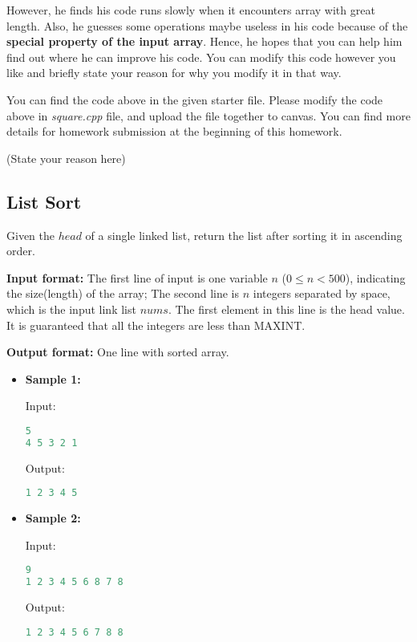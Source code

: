 \documentclass[11pt]{exam}
\begin{document}
However, he finds his code runs slowly when it encounters array with great length. Also, he guesses some operations maybe useless in his code because of the \textbf{special property of the input array}. Hence, he hopes that you can help him find out where he can improve his code. You can modify this code however you like and briefly state your reason for why you modify it in that way.

You can find the code above in the given starter file. Please modify the code above in \textit{square.cpp} file, and upload the file together to canvas. You can find more details for homework submission at the beginning of this homework.
\begin{solution}
(State your reason here)
\end{solution}

\subsection{List Sort}

Given the $head$ of a single linked list, return the list after sorting it in ascending order.

\textbf{Input format:} The first line of input is one variable $n$ ($0 \leq n < 500$), indicating the size(length) of the array; The second line is $n$ integers separated by space, which is the input link list $nums$. The first element in this line is the head value. It is guaranteed that all the integers are less than MAXINT. 

\textbf{Output format:} One line with sorted array.

\begin{itemize}
\item \textbf{Sample 1:}

Input:
\begin{lstlisting}[language=c++]
5
4 5 3 2 1
\end{lstlisting}

Output:
\begin{lstlisting}[language=c++]
1 2 3 4 5
\end{lstlisting}


\item \textbf{Sample 2:}

Input:
\begin{lstlisting}[language=c++]
9
1 2 3 4 5 6 8 7 8
\end{lstlisting}

Output:
\begin{lstlisting}[language=c++]
1 2 3 4 5 6 7 8 8
\end{lstlisting}
\end{itemize}
\end{document}
